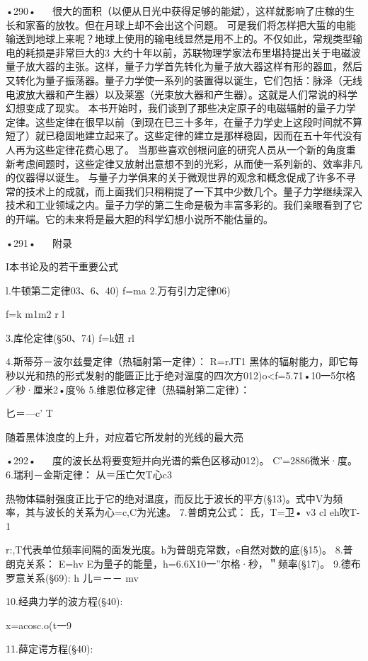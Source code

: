 •290•
  
很大的面积（以便从日光中获得足够的能斌），这样就影响了庄稼的生长和家畜的放牧。但在月球上却不会出这个问题。
可是我们将怎样把大蜇的电能输送到地球上来呢？地球上使用的输电线显然是用不上的。不仅如此，常规类型输电的耗损是非常巨大的3
大约十年以前，苏联物理学家法布里堪持提出关于电磁波量子放大器的主张。这样，量子力学首先转化为量子放大器这样有形的器皿，然后又转化为量子振荡器。量子力学使一系列的装置得以诞生，它们包括：脉泽（无线电波放大器和产生器）以及莱塞（光束放大器和产生器）。这就是人们常说的科学幻想变成了现实。
本书开始时，我们谈到了那些决定原子的电磁辐射的量子力学定律。这些定律在很早以前（到现在巳三十多年，在量子力学史上这段时间就不算短了）就已稳固地建立起来了。这些定律的建立是那样稳固，因而在五十年代没有人再为这些定律花费心思了。
当那些喜欢创根问底的研究人员从一个新的角度重新考虑间题时，这些定律又放射出意想不到的光彩，从而使一系列新的、效率非凡的仪器得以诞生。
与量子力学俱来的关于微观世界的观念和概念促成了许多不寻常的技术上的成就，而上面我们只稍稍提了一下其中少数几个。量子力学继续深入技术和工业领域之内。量子力学的第二生命是极为丰富多彩的。我们亲眼看到了它的开端。它的未来将是最大胆的科学幻想小说所不能估量的。

•291•
  
附录

I本书论及的若干重要公式

l.牛顿第二定律03、6、40)
f=ma
2.万有引力定律06)

f=k
m1m2
r
l

3.库伦定律(§50、74)
f=k妞
rl

4.斯蒂芬－波尔兹曼定律（热辐射第一定律）：
R=rJT1
黑体的辐射能力，即它每秒以光和热的形式发射的能匮正比于绝对温度的四次方012)o<f=5.71•10一5尔格／秒·厘米2•度％
5.维恩位移定律（热辐射第二定律）：

匕＝—c'
T

随着黑体浪度的上升，对应着它所发射的光线的最大亮

•292•
  
度的波长丛将要变短并向光谱的紫色区移动012)。
C'=2886微米·度。
6.瑞利－金斯定律：
从＝压亡欠T心c3

热物体辐射强度正比于它的绝对温度，而反比于波长的平方(§13)。式中V为频率，其与波长的关系为心=c,C为光速。
7.普朗克公式：
	氏，T=卫•	v3
	cl	eh吹T-1

r:,T代表单位频率间隔的面发光度。h为普朗克常数，e自然对数的底(§15)。
8.普朗克关系：
E=hv
E为量子的能量，h=6.6X10一”尔格·秒，＂频率(§17)。
9.德布罗意关系(§69):
h
儿＝－－
mv

10.经典力学的波方程(§40):

x=acosc.o(t一9

11.薛定谔方程(§40):

